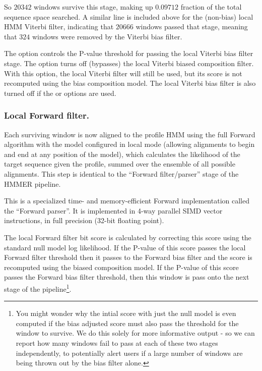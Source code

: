 So $20342$ windows survive this stage, making up $0.09712$ fraction of
the total sequence space searched. A similar line is included above
for the (non-bias) local HMM Viterbi filter, indicating that $20666$
windows passed that stage, meaning that $324$ windows were removed by
the Viterbi bias filter. 

The  option controls the P-value threshold for
passing the local Viterbi bias filter stage.  The 
option turns off (bypasses) the local Viterbi biased composition
filter. With this option, the local Viterbi filter will still be used,
but its score is not recomputed using the bias composition model.  The
local Viterbi bias filter is also turned off if the  or
 options are used.

\subsubsection{Local Forward filter.}

Each surviving window is now aligned to the profile HMM using the full
Forward algorithm with the model configured in local mode (allowing
alignments to begin and end at any position of the model), which
calculates the likelihood of the target sequence given the profile,
summed over the ensemble of all possible alignments. This step is
identical to the ``Forward filter/parser'' stage of the HMMER
pipeline.

This is a specialized time- and memory-efficient Forward
implementation called the ``Forward parser''. It is implemented in
4-way parallel SIMD vector instructions, in full precision (32-bit
floating point). 

The local Forward filter bit score is calculated by correcting this
score using the standard null model log likelihood. If the P-value of
this score passes the local Forward filter threshold then it passes to
the Forward bias filter and the score is recomputed using the biased
composition model. If the P-value of this score passes the Forward
bias filter threshold, then this window is pass onto the next stage of
the pipeline\footnote{You might wonder why the intial score with just
the null model is even computed if the bias adjusted score must also
pass the threshold for the window to survive. We do this solely for
more informative output - so we can report how many windows fail to
pass at each of these two stages independently, to potentially alert
users if a large number of windows are being thrown out by the bias
filter alone.}. 

